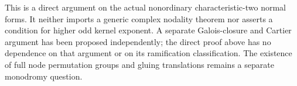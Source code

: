 \begin{remark}
\label{rem:root-trigonal-direct-scope-candidate}
This is a direct argument on the actual nonordinary characteristic-two
normal forms. It neither imports a generic complex nodality theorem
nor asserts a condition for higher odd kernel exponent. A separate
Galois-closure and Cartier argument has been proposed independently;
the direct proof above has no dependence on that argument or on its
ramification classification. The existence of full node permutation
groups and gluing translations remains a separate monodromy question.
\end{remark}
